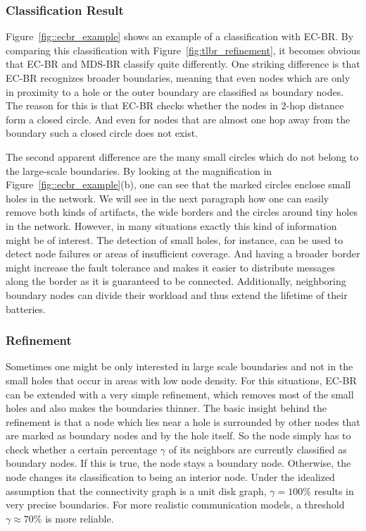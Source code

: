 \documentclass{llncs}
\begin{document}
\subsubsection{Classification Result}
Figure~\ref{fig::ecbr_example} shows an example of a classification with EC-BR.
By comparing this classification with Figure~\ref{fig:tlbr_refinement}, it becomes obvious that EC-BR and MDS-BR classify quite differently.
One striking difference is that EC-BR recognizes broader boundaries, meaning that even nodes which are only in proximity to a hole or the outer boundary are classified as boundary nodes.
The reason for this is that EC-BR checks whether the nodes in $2$-hop distance form a closed circle.
And even for nodes that are almost one hop away from the boundary such a closed circle does not exist.

The second apparent difference are the many small circles which do not belong to the large-scale boundaries.
By looking at the magnification in Figure~\ref{fig::ecbr_example}(b), one can see that the marked circles enclose small holes in the network.
We will see in the next paragraph how one can easily remove both kinds of artifacts, the wide borders and the circles around tiny holes in the network.
However, in many situations exactly this kind of information might be of interest.
The detection of small holes, for instance, can be used to detect node failures or areas of insufficient coverage.
And having a broader border might increase the fault tolerance and makes it easier to distribute messages along the border as it is guaranteed to be connected.
Additionally, neighboring boundary nodes can divide their workload and thus extend the lifetime of their batteries.

\subsubsection{Refinement}
Sometimes one might be only interested in large scale boundaries and not in the small holes that occur in areas with low node density.
For this situations, EC-BR can be extended with a very simple refinement, which removes most of the small holes and also makes the boundaries thinner.
The basic insight behind the refinement is that a node which lies near a hole is surrounded by other nodes that are marked as boundary nodes and by the hole itself.
So the node simply has to check whether a certain percentage $\gamma$ of its neighbors are currently classified as boundary nodes.
If this is true, the node stays a boundary node.
Otherwise, the node changes its classification to being an interior node.
Under the idealized assumption that the connectivity graph is a unit disk graph, $\gamma=100\%$ results in very precise boundaries.
For more realistic communication models, a threshold $\gamma \approx 70\%$ is more reliable.
\end{document}
